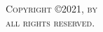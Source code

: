 \newpage
\thispagestyle{empty}
\addtocounter{page}{-1}
\vspace*{\fill}
\scshape \noindent Copyright \copyright 2021, by \authorname \\
\noindent all rights reserved.
\vspace*{\fill}
\newpage
\rm